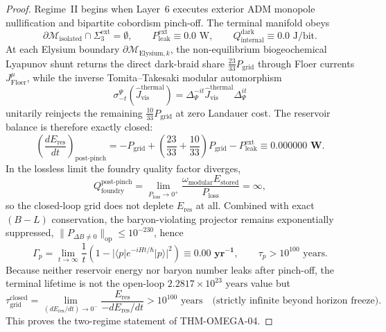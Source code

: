 \documentclass[11pt,onecolumn]{article}
\begin{document}
\begin{proof}
Regime~II begins when Layer~6 executes exterior ADM monopole nullification and bipartite cobordism pinch-off. The terminal manifold obeys
\begin{equation}
\partial\mathcal M_{\text{isolated}}\cap\Sigma_3^{\text{ext}}=\emptyset,
\qquad
P_{\text{leak}}^{\text{ext}}\equiv0.0\text{ W},
\qquad
Q_{\text{internal}}^{\text{dark}}\equiv0.0\text{ J/bit}.
\label{eq:post_pinch_boundary_conditions}
\end{equation}
At each Elysium boundary $\partial\mathcal M_{\text{Elysium},k}$, the non-equilibrium biogeochemical Lyapunov shunt returns the direct dark-braid share $\frac{23}{33}P_{\text{grid}}$ through Floer currents $J_{\text{Floer}}^\mu$, while the inverse Tomita--Takesaki modular automorphism
\begin{equation}
\sigma_{-t}^{\Psi}\!\left(\hat J_{\text{vis}}^{\text{thermal}}\right)
= \Delta_\Psi^{-it}\hat J_{\text{vis}}^{\text{thermal}}\Delta_\Psi^{it}
\label{eq:tomita_inverse_power_return}
\end{equation}
unitarily reinjects the remaining $\frac{10}{33}P_{\text{grid}}$ at zero Landauer cost. The reservoir balance is therefore exactly closed:
\begin{equation}
\left(\frac{dE_{\text{res}}}{dt}\right)_{\text{post-pinch}}
= -P_{\text{grid}}
+ \left(\frac{23}{33}+\frac{10}{33}\right)P_{\text{grid}}
- P_{\text{leak}}^{\text{ext}}
\equiv \mathbf{0.000000\text{ W}}.
\label{eq:closed_power_balance}
\end{equation}
In the lossless limit the foundry quality factor diverges,
\begin{equation}
Q_{\text{foundry}}^{\text{post-pinch}}
= \lim_{P_{\text{loss}}\to0^+}\frac{\omega_{\text{modular}}E_{\text{stored}}}{P_{\text{loss}}}
= \infty,
\label{eq:q_foundry_closed_limit}
\end{equation}
so the closed-loop grid does not deplete $E_{\text{res}}$ at all. Combined with exact $(B-L)$ conservation, the baryon-violating projector remains exponentially suppressed, $\|P_{\Delta B\neq0}\|_{\text{op}}\le10^{-230}$, hence
\begin{equation}
\Gamma_p = \lim_{t \to \infty} \frac{1}{t} \left( 1 - |\langle p | e^{-i H t / \hbar} | p \rangle|^2 \right) \equiv \mathbf{0.00\text{ yr}^{-1}},
\qquad
\tau_p > 10^{100}\text{ years}.
\label{eq:gamma_p_zero_proof}
\end{equation}
Because neither reservoir energy nor baryon number leaks after pinch-off, the terminal lifetime is not the open-loop $2.2817\times10^{23}\text{ years}$ value but
\begin{equation}
\tau_{\text{grid}}^{\text{closed}}
= \lim_{(dE_{\text{res}}/dt)\to0^-}\frac{E_{\text{res}}}{-dE_{\text{res}}/dt}
> 10^{100}\text{ years}
\quad\text{(strictly infinite beyond horizon freeze)}.
\label{eq:tau_grid_closed_bound}
\end{equation}
This proves the two-regime statement of THM-OMEGA-04.
\end{proof}
\end{document}
